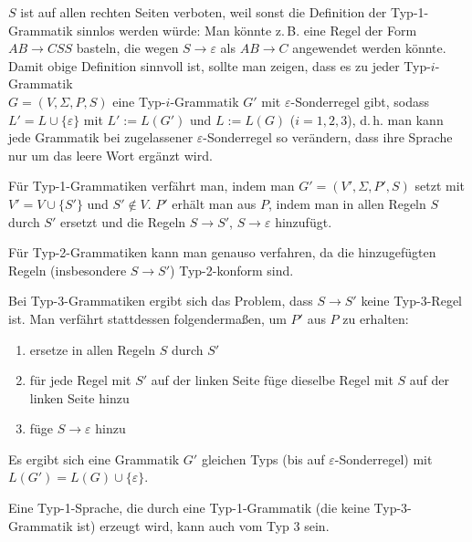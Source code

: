 \begin{Bem}
    $S$ ist auf allen rechten Seiten verboten, weil sonst die Definition
    der Typ-1-Grammatik sinnlos werden würde:
    Man könnte z.\,B. eine Regel der Form $AB \rightarrow CSS$
    basteln, die wegen $S \rightarrow \varepsilon$ als $AB \rightarrow C$
    angewendet werden könnte.\\
    Damit obige Definition sinnvoll ist, sollte man zeigen,
    dass es zu jeder Typ-$i$-Grammatik\\
    $G = (V, \Sigma, P, S)$ eine Typ-$i$-Grammatik $G'$ mit
    $\varepsilon$-Sonderregel gibt, sodass
    $L' = L \cup \{\varepsilon\}$ mit $L' := L(G')$ und $L := L(G)$
    ($i = 1, 2, 3$), d.\,h. man kann jede Grammatik bei zugelassener
    $\varepsilon$-Sonderregel so verändern, dass ihre Sprache nur um
    das leere Wort ergänzt wird.

    Für Typ-1-Grammatiken verfährt man, indem man
    $G' = (V', \Sigma, P', S)$ setzt mit $V' = V \cup \{S'\}$
    und $S' \notin V$.
    $P'$ erhält man aus $P$, indem man in allen Regeln $S$ durch $S'$ ersetzt
    und die Regeln $S \rightarrow S'$, $S \rightarrow \varepsilon$
    hinzufügt.

    Für Typ-2-Grammatiken kann man genauso verfahren, da
    die hinzugefügten Regeln (insbesondere $S \rightarrow S'$)
    Typ-2-konform sind.

    Bei Typ-3-Grammatiken ergibt sich das Problem, dass $S \rightarrow S'$
    keine Typ-3-Regel ist.
    Man verfährt stattdessen folgendermaßen, um $P'$ aus $P$ zu erhalten:
    \begin{enumerate}
        \item
        ersetze in allen Regeln $S$ durch $S'$

        \item
        für jede Regel mit $S'$ auf der linken Seite füge dieselbe Regel
        mit $S$ auf der linken Seite hinzu

        \item
        füge $S \rightarrow \varepsilon$ hinzu
    \end{enumerate}
    Es ergibt sich eine Grammatik $G'$ gleichen Typs
    (bis auf $\varepsilon$-Sonderregel) mit
    $L(G') = L(G) \cup \{\varepsilon\}$.
\end{Bem}

\linie

\begin{Bem}
    Eine Typ-1-Sprache, die durch eine Typ-1-Grammatik
    (die keine Typ-3-Grammatik ist) erzeugt wird,
    kann auch vom Typ 3 sein.
\end{Bem}

